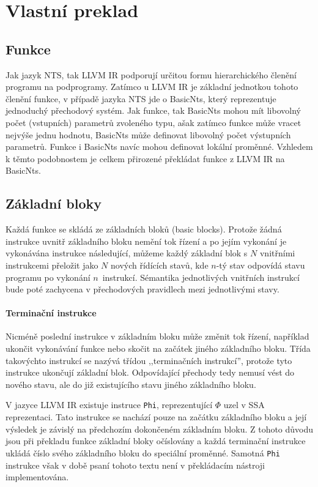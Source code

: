 \documentclass[12pt]{fithesis2}
\begin{document}
\section{Vlastní preklad}

\subsection{Funkce}
Jak jazyk NTS, tak LLVM IR podporují určitou formu hierarchického členění programu na podprogramy. Zatímco u LLVM IR je základní jednotkou tohoto členění funkce, v případě jazyka NTS jde o BasicNts, který reprezentuje jednoduchý přechodový systém. Jak funkce, tak BasicNts mohou mít libovolný počet (vstupních) parametrů zvoleného typu, ašak zatímco funkce může vracet nejvýše jednu hodnotu, BasicNts může definovat libovolný počet výstupních parametrů. Funkce i BasicNts navíc mohou definovat lokální proměnné. Vzhledem k těmto podobnostem je celkem přirozené překládat funkce z LLVM IR na BasicNts.

\subsection{Základní bloky}
Každá funkce se skládá ze základních bloků (basic blocks). Protože žádná instrukce uvnitř základního bloku nemění tok řízení a po jejím vykonání je vykonávána instrukce následující, můžeme každý základní blok s $N$ vnitřními instrukcemi přeložit jako $N$ nových řídících stavů, kde $n$-tý stav odpovídá stavu programu po vykonání $n$~instrukcí. Sémantika jednotlivých vnitřních instrukcí bude poté zachycena v přechodových pravidlech mezi jednotlivými stavy.

\paragraph{Terminační instrukce}
Nicméně poslední instrukce v základním bloku může změnit tok řízení, například ukončit vykonávání funkce nebo skočit na začátek jiného základního bloku. Třída takovýchto instrukcí se nazývá třídou ,,terminačních instrukcí'', protože tyto instrukce ukončují základní blok. Odpovídající přechody tedy nemusí vést do nového stavu, ale do již existujícího stavu jiného základního bloku.

V jazyce LLVM IR existuje instruce \texttt{Phi}, reprezentující $\Phi$ uzel v SSA reprezentaci. Tato instrukce se nachází pouze na začátku základního bloku a její výsledek je závislý na předchozím dokončeném základním bloku. Z tohoto důvodu jsou při překladu funkce základní bloky očíslovány a každá terminační instrukce ukládá číslo svého základního bloku do speciální proměnné. Samotná \texttt{Phi} instrukce však v době psaní tohoto textu není v překládacím nástroji implementována.
\end{document}
